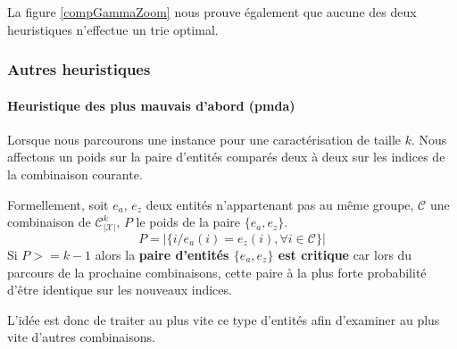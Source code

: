 La figure \ref{compGammaZoom} nous prouve également que aucune des deux heuristiques n'effectue un trie optimal.

\subsubsection{Autres heuristiques }
\paragraph{Heuristique des plus mauvais d'abord (pmda)}
Lorsque nous parcourons une instance pour une caractérisation de taille $k$. Nous affectons un poids sur la paire d'entités comparés deux à deux sur les indices de la combinaison courante.



\begin{definition}
Formellement, soit $e_a$, $e_z$ deux entités n'appartenant pas au même groupe, $\mathcal{C}$ une combinaison de $\mathcal{C}_{|\mathcal{X}|}^k$, $P$ le poids de la paire $\{e_a,e_z\}$.
$$ P = |\{i / e_a(i)=e_z(i), \forall i \in \mathcal{C}\}| $$
Si $P>=k-1$ alors la \textbf{paire d'entités $\{e_a,e_z\}$ est critique} car lors du parcours de la prochaine combinaisons, cette paire à la plus forte probabilité d'être identique sur les nouveaux indices.
\end{definition}

L'idée est donc de traiter au plus vite ce type d'entités afin d'examiner au plus vite d'autres combinaisons.

